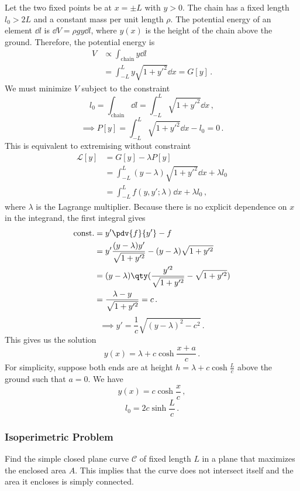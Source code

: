 \documentclass{article}
\theoremstyle{plain}\theoremheaderfont{\normalfont\itshape}\theorembodyfont{\rmfamily}\theoremseparator{.}\newtheorem*{rem}{Remark}\newtheorem*{ex}{Example}\newtheorem*{proof}{Proof}\newtheorem*{altp}{Alternative proof}
\theoremstyle{plain}\theoremheaderfont{\normalfont\bfseries}\theorembodyfont{\rmfamily}\theoremseparator{.}\newtheorem{thm}{Theorem}[section]\newtheorem{lem}[thm]{Lemma}\newtheorem{prop}[thm]{Proposition}\newtheorem*{cor}{Corollary}\newtheorem{defn}[thm]{Definition}\newtheorem{clm}[thm]{Claim}\newtheorem{clminproof}{Claim}
\theoremstyle{break}\theoremheaderfont{\normalfont\itshape}\theorembodyfont{\rmfamily}\theoremseparator{.\medskip}\newtheorem*{proofskip}{Proof}\newtheorem*{exs}{Examples}\newtheorem*{rems}{Remarks}
\theoremstyle{break}\theoremheaderfont{\normalfont\bfseries}\theorembodyfont{\rmfamily}\theoremseparator{.\medskip}\newtheorem{lemskip}[thm]{Lemma}\newtheorem{defnskip}[thm]{Definition}\newtheorem{propskip}[thm]{Proposition}\newtheorem{thmskip}[thm]{Theorem}
\numberwithin{equation}{section}
\begin{document}
	Let the two fixed points be at \(x=\pm L\) with \(y>0\). The chain has a fixed length \(l_0>2L\) and a constant mass per unit length \(\rho\). The potential energy of an element \(\dd{l}\) is \(\dd{V}=\rho gy\dd{l}\), where \(y(x)\) is the height of the chain above the ground. Therefore, the potential energy is
	\begin{align*}
		V&\propto \int_{\text{chain}}y\dd{l}\\
		&=\int_{-L}^{L}y\sqrt{1+y'^2}\dd{x}=G[y]\,.
	\end{align*}
	We must minimize \(V\) subject to the constraint
	\[l_0=\int_{\text{chain}}\dd{l}=\int_{-L}^{L}\sqrt{1+y'^2}\dd{x}\,,\]
	\[\implies P[y]=\int_{-L}^{L}\sqrt{1+y'^2}\dd{x}-l_0=0\,.\]
	This is equivalent to extremising without constraint
	\begin{align*}
		\mathcal{L}[y]&=G[y]-\lambda P[y]\\
		&=\int_{-L}^{L}(y-\lambda)\sqrt{1+y'^2}\dd{x}+\lambda l_0\\
		&=\int_{-L}^{L}f(y,y';\lambda)\dd{x}+\lambda l_0\,,
	\end{align*}
	where \(\lambda\) is the Lagrange multiplier. Because there is no explicit dependence on \(x\) in the integrand, the first integral gives
	\begin{align*}
		\text{const.}&=y'\pdv{f}{y'}-f\\
		&=y'\frac{(y-\lambda)y'}{\sqrt{1+y'^2}}-(y-\lambda)\sqrt{1+y'^2}\\
		&=(y-\lambda)\qty(\frac{y'^2}{\sqrt{1+y'^2}}-\sqrt{1+y'^2})\\
		&=\frac{\lambda-y}{\sqrt{1+y'^2}}=c\,.
	\end{align*}
	\[\implies y'=\frac{1}{c}\sqrt{(y-\lambda)^2-c^2}\,.\]
	This gives us the solution
	\[y(x)=\lambda+c\cosh\frac{x+a}{c}\,.\]
	For simplicity, suppose both ends are at height \(h=\lambda+c\cosh\frac{L}{c}\) above the ground such that \(a=0\). We have
	\[y(x)=c\cosh\frac{x}{c}\,,\]
	\[l_0=2c\sinh\frac{L}{c}\,.\]
	\subsubsection{Isoperimetric Problem}
	Find the simple closed plane curve \(\mathcal{C}\) of fixed length \(L\) in a plane that maximizes the enclosed area \(A\). This implies that the curve does not intersect itself and the area it encloses is simply connected.
\end{document}
